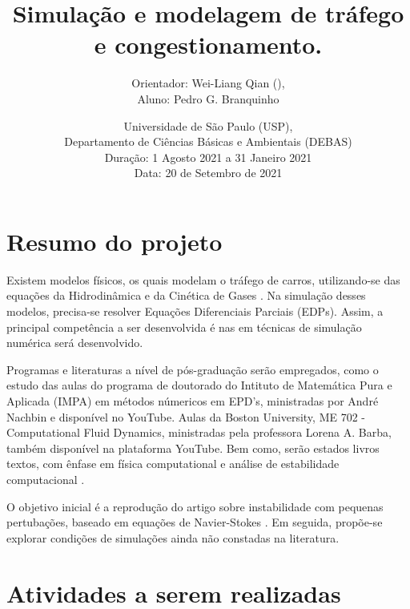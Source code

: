 \documentclass[12pt, brazilian]{article}
\author{Orientador: Wei-Liang Qian ({\ch{钱卫良}}), \\ Aluno: Pedro G. Branquinho}
\date{\vspace{4cm}Universidade de São Paulo (USP), \vspace{0.3cm} \\ Departamento de Ciências Básicas e Ambientais (DEBAS)\vspace{2cm}\\ Duração: 1 Agosto 2021 a 31 Janeiro 2021 \vspace{0.3cm}\\
  Data: 20 de Setembro de 2021}
\title{Simulação e modelagem de tráfego e congestionamento.\vspace{3cm}}
\begin{document}
\maketitle
\clearpage

\tableofcontents
\clearpage


\section{Resumo do projeto}
\label{sec:orgf619300}
Existem modelos físicos, os quais modelam o tráfego de carros,
utilizando-se das equações da Hidrodinâmica \cite{kerner1993cluster} e
da Cinética de Gases \cite{bando1995dynamical}. Na simulação desses
modelos, precisa-se resolver Equações Diferenciais Parciais
(EDPs). Assim, a principal competência a ser desenvolvida é nas em técnicas de simulação numérica será desenvolvido.

Programas e literaturas a nível de pós-graduação serão empregados, como o estudo das aulas do programa de doutorado do Intituto de Matemática Pura e Aplicada (IMPA) em
métodos númericos em EPD's, ministradas por André Nachbin e
disponível no YouTube. Aulas da Boston University, ME 702 -
Computational Fluid Dynamics, ministradas pela professora Lorena
A. Barba, também disponível na plataforma YouTube. Bem como, serão
estados livros textos, com ênfase em física computational e análise de
estabilidade computacional \cite{press1986numerical}.

O objetivo inicial é a reprodução do artigo sobre instabilidade com
pequenas pertubações, baseado em equações de Navier-Stokes
\cite{kerner1993cluster}. Em seguida, propõe-se explorar condições de
simulações ainda não constadas na literatura.

\section{Atividades a serem realizadas}
\label{sec:orgd0f4673}
\end{document}
